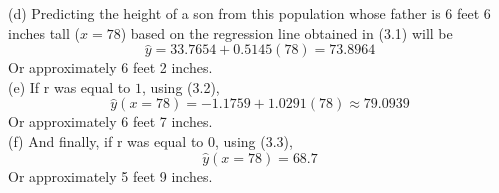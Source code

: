 \documentclass[boxes, qed]{homework}
\begin{document}
\begin{solution}
  (d) Predicting the height of a son from this population whose father is 6 feet 6 inches tall ($x=78$)
  based on the regression line obtained in (3.1) will be
  $$\hat{y} = 33.7654+0.5145(78) = 73.8964$$
  Or approximately 6 feet 2 inches.\\
  
  (e) If r was equal to $1$, using (3.2),
  $$\hat{y}(x=78) = -1.1759 + 1.0291(78) \approx 79.0939$$
  Or approximately 6 feet 7 inches.\\
  
  (f) And finally, if r was equal to $0$, using (3.3),
  $$\hat{y}(x=78) = 68.7$$
  Or approximately 5 feet 9 inches.\\
\end{solution}
\end{document}
